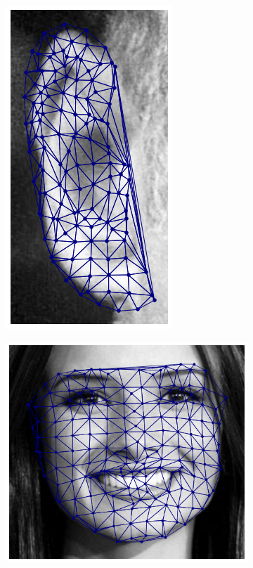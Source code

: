 \begin{figure}[!h]
\begin{subfigure}[b]{0.7\textwidth}
    \end{subfigure}
    \begin{subfigure}[b]{0.7\textwidth}
            \includegraphics[height=1\textwidth]{supports/Fittings/fitting_ear_0040}
    \end{subfigure}
    \begin{subfigure}[b]{0.115\textwidth}
            \includegraphics[height=1\textwidth]{supports/Fittings/fitting_face_0001}

\end{subfigure}
\end{figure}
